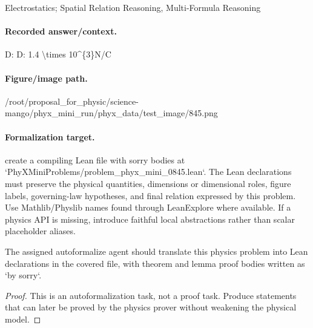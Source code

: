 Electrostatics; Spatial Relation Reasoning, Multi-Formula Reasoning

\paragraph{Recorded answer/context.}
D: D: 1.4 \textbackslash{}times 10\textasciicircum{}\{3\}N/C

\paragraph{Figure/image path.}
/root/proposal\_for\_physic/science-mango/phyx\_mini\_run/phyx\_data/test\_image/845.png

\paragraph{Formalization target.}
create a compiling Lean file with sorry bodies at `PhyXMiniProblems/problem\_phyx\_mini\_0845.lean`. The Lean declarations must preserve the physical quantities, dimensions or dimensional roles, figure labels, governing-law hypotheses, and final relation expressed by this problem.
Use Mathlib/Physlib names found through LeanExplore where available. If a physics API is missing, introduce faithful local abstractions rather than scalar placeholder aliases.

\begin{theorem}
\label{thm:physics:phyx_mini_0845:target}
The assigned autoformalize agent should translate this physics problem into Lean declarations in the covered file, with theorem and lemma proof bodies written as `by sorry`.
\end{theorem}
\begin{proof}
This is an autoformalization task, not a proof task. Produce statements that can later be proved by the physics prover without weakening the physical model.
\end{proof}

